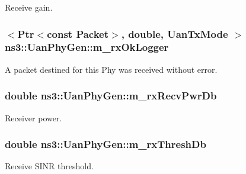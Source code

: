 Receive gain. 

\subsubsection[{\texorpdfstring{m\+\_\+rx\+Ok\+Logger}{m_rxOkLogger}}]{$<${\bf Ptr}$<$const {\bf Packet}$>$, double, {\bf Uan\+Tx\+Mode} $>$ ns3\+::\+Uan\+Phy\+Gen\+::m\+\_\+rx\+Ok\+Logger\hspace{0.3cm}{\ttfamily [private]}}\hypertarget{classns3_1_1UanPhyGen_a151fedae9333b5fdfa5a88ae2fb459d4}{}\label{classns3_1_1UanPhyGen_a151fedae9333b5fdfa5a88ae2fb459d4}
A packet destined for this Phy was received without error. 
\subsubsection[{\texorpdfstring{m\+\_\+rx\+Recv\+Pwr\+Db}{m_rxRecvPwrDb}}]{\setlength{\rightskip}{0pt plus 5cm}double ns3\+::\+Uan\+Phy\+Gen\+::m\+\_\+rx\+Recv\+Pwr\+Db\hspace{0.3cm}{\ttfamily [private]}}\hypertarget{classns3_1_1UanPhyGen_a476fe8377d9db0f010e4d1b0e7100f7c}{}\label{classns3_1_1UanPhyGen_a476fe8377d9db0f010e4d1b0e7100f7c}


Receiver power. 

\subsubsection[{\texorpdfstring{m\+\_\+rx\+Thresh\+Db}{m_rxThreshDb}}]{\setlength{\rightskip}{0pt plus 5cm}double ns3\+::\+Uan\+Phy\+Gen\+::m\+\_\+rx\+Thresh\+Db\hspace{0.3cm}{\ttfamily [private]}}\hypertarget{classns3_1_1UanPhyGen_a6ec1e85d014bee5481cee7882ded946c}{}\label{classns3_1_1UanPhyGen_a6ec1e85d014bee5481cee7882ded946c}


Receive S\+I\+NR threshold. 

